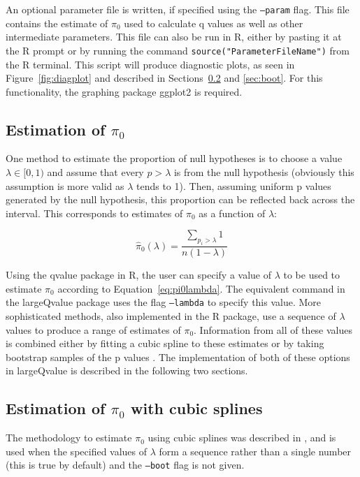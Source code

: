 \documentclass{amsart}
\begin{document}
An optional parameter file is written, if specified using the \texttt{--param} flag. This file contains the estimate of $\pi_0$ used to calculate q values as well as other intermediate parameters. This file can also be run in R, either by pasting it at the R prompt or by running the command \texttt{source("ParameterFileName")} from the R terminal. This script will produce diagnostic plots, as seen in Figure~\ref{fig:diagplot} and described in Sections~\ref{sec:spline} and \ref{sec:boot}. For this functionality, the graphing package ggplot2 \citep{ggplot} is required.

\subsection{Estimation of $\pi_0$}
\label{sec:pi0}

One method to estimate the proportion of null hypotheses is to choose a value $\lambda\in [0, 1)$ and assume that every $p > \lambda$ is from the null hypothesis (obviously this assumption is more valid as $\lambda$ tends to 1). Then, assuming uniform p values generated by the null hypothesis, this proportion can be reflected back across the interval. This corresponds to estimates of $\pi_0$ as a function of $\lambda$:

\begin{equation}
  \label{eq:pi0lambda}
  \hat{\pi}_0(\lambda) = \frac{\sum_{p_i > \lambda}1}{n(1-\lambda)} 
\end{equation}

Using the qvalue package in R, the user can specify a value of $\lambda$ to be used to estimate $\pi_0$ according to Equation~\ref{eq:pi0lambda}. The equivalent command in the largeQvalue package uses the flag \texttt{--lambda} to specify this value. More sophisticated methods, also implemented in the R package, use a sequence of $\lambda$ values to produce a range of estimates of $\pi_0$. Information from all of these values is combined either by fitting a cubic spline to these estimates \citep{splinestorey} or by taking bootstrap samples of the p values \citep{bootstorey}. The implementation of both of these options in largeQvalue is described in the following two sections.

\subsection{Estimation of $\pi_0$ with cubic splines}
\label{sec:spline}
The methodology to estimate $\pi_0$ using cubic splines was described in \citet{splinestorey}, and is used when the specified values of $\lambda$ form a sequence rather than a single number (this is true by default) and the \texttt{--boot} flag is not given.
\end{document}

